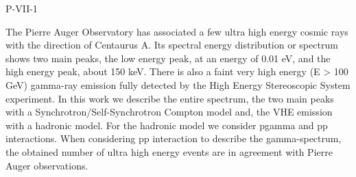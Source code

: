 P-VII-1


\bigskip



\bigskip

\noindent The Pierre Auger Observatory has associated a few ultra high energy cosmic rays  with the direction of Centaurus A. Its spectral energy distribution or spectrum shows two main peaks, the low energy peak, at an energy of  0.01 eV,  and the high energy peak, about 150 keV. There is also a faint very high energy (E > 100 GeV) gamma-ray emission fully detected by the High Energy Stereoscopic System experiment.  In this work  we describe the entire spectrum, the two main peaks with a Synchrotron/Self-Synchrotron Compton model and, the VHE emission with a hadronic model.  For the hadronic model we consider pgamma and pp interactions. When considering  pp interaction to describe the gamma-spectrum, the obtained number of ultra high energy events are in agreement with Pierre Auger observations.

